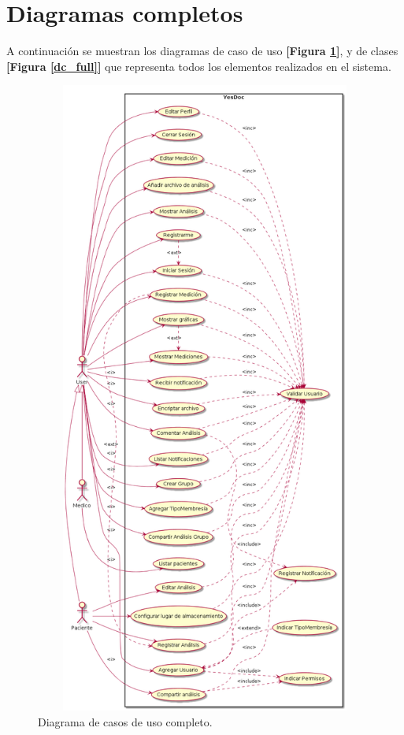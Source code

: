 \section{Diagramas completos}
A continuación se muestran los diagramas de caso de uso \textbf{[Figura \ref{dcu-full}]}, y de clases \textbf{[Figura \ref{dc_full}]} que representa todos los elementos realizados en el sistema.


\begin{figure}[h]
	\centering
	\includegraphics[width=15cm, height=21cm]{img/dcu_final}
	\caption{Diagrama de casos de uso completo.}
	\label{dcu-full}
	\end{figure}
	


